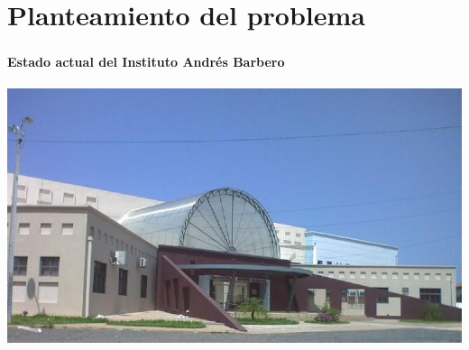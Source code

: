 \section{Planteamiento del problema}
\setcounter{sectiontotal}{2}

\begin{frame}
\frametitle{\pagetitle}
\framesubtitle{Estado actual del Instituto Andrés Barbero}

\includegraphics[width=\textwidth]{imagenes/iab.jpg} 

\end{frame}

